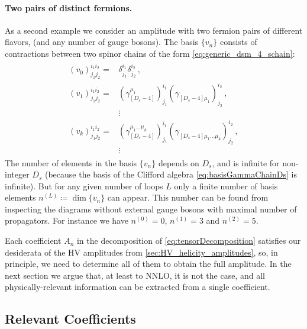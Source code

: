 \paragraph{Two pairs of distinct fermions.}
As a second example we consider an amplitude with two fermion pairs of different flavors, (and any number of gauge bosons). 
The basis $\{v_n\}$ consists of contractions between two spinor chains of the form \cref{eq:generic_dsm_4_schain}:
\begin{align}
  \begin{split} \label{eqn:4qtensors}
    (v_0)_{j_1j_2}^{i_1i_2}   = &
    \delta_{j_1}^{i_1} \delta_{j_2}^{i_2}\,, \\
    (v_1)_{j_1j_2}^{i_1i_2}=
    &(\gamma_{[D_s-4]}^{\mu_1} )_{j_1}^{i_1} 
    (\gamma_{[D_s-4]\mu_1}^{\phantom{\mu}})_{j_2}^{i_2}\,, \\
    & \vdots\\
    (v_k)_{j_1j_2}^{i_1i_2}=
    &(\gamma_{[D_s-4]}^{\mu_1 \ldots  \mu_k})_{j_1}^{i_1}
    (\gamma_{[D_s-4]\mu_1 \ldots \mu_k}^{\phantom{\mu}})_{j_2}^{i_2}\,,\\
    & \vdots\,
  \end{split}
\end{align}
The number of elements in the basis $\{v_n\}$ depends on $D_s$,
and is infinite for non-integer $D_s$ (because the basis of the Clifford algebra \cref{eq:basisGammaChainDs} is infinite).
But for any given number of loops $L$ only a finite number of basis elements $n^{(L)}\coloneqq \dim\{v_n\}$ can appear.
This number can be found from inspecting the diagrams without external gauge bosons 
with maximal number of propagators.
For instance we have $n^{(0)}=0$, $n^{(1)}=3$ and $n^{(2)}=5$.

Each coefficient $A_n$ in the decomposition of \cref{eq:tensorDecomposition} satisfies our desiderata 
of the HV amplitudes from \cref{sec:HV_helicity_amplitudes}, so, in principle, we need to determine all of them to obtain the full amplitude.
In the next section we argue that, at least to NNLO, it is not the case, 
and all physically-relevant information can be extracted from a single coefficient.  

\subsection{Relevant Coefficients}
\label{sec:relevant_tensors}

